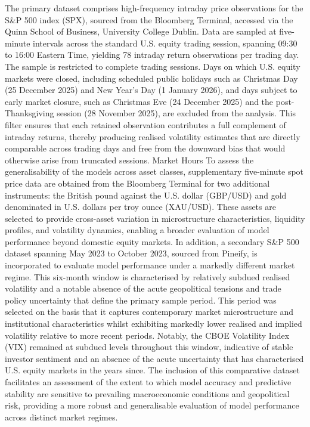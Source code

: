 \documentclass[12pt,a4paper]{report}
\begin{document}
The primary dataset comprises high-frequency intraday price observations for the S&P 500 index (SPX), sourced from the Bloomberg Terminal, accessed via the Quinn School of Business, University College Dublin. Data are sampled at five-minute intervals across the standard U.S. equity trading session, spanning 09:30 to 16:00 Eastern Time, yielding 78 intraday return observations per trading day.
The sample is restricted to complete trading sessions. Days on which U.S. equity markets were closed, including scheduled public holidays such as Christmas Day (25 December 2025) and New Year's Day (1 January 2026), and days subject to early market closure, such as Christmas Eve (24 December 2025) and the post-Thanksgiving session (28 November 2025), are excluded from the analysis. This filter ensures that each retained observation contributes a full complement of intraday returns, thereby producing realised volatility estimates that are directly comparable across trading days and free from the downward bias that would otherwise arise from truncated sessions.
Market Hours
To assess the generalisability of the models across asset classes, supplementary five-minute spot price data are obtained from the Bloomberg Terminal for two additional instruments: the British pound against the U.S. dollar (GBP/USD) and gold denominated in U.S. dollars per troy ounce (XAU/USD). These assets are selected to provide cross-asset variation in microstructure characteristics, liquidity profiles, and volatility dynamics, enabling a broader evaluation of model performance beyond domestic equity markets.
In addition, a secondary S&P 500 dataset spanning May 2023 to October 2023, sourced from Pineify, is incorporated to evaluate model performance under a markedly different market regime. This six-month window is characterised by relatively subdued realised volatility and a notable absence of the acute geopolitical tensions and trade policy uncertainty that define the primary sample period. 
This period was selected on the basis that it captures contemporary market microstructure and institutional characteristics whilst exhibiting markedly lower realised and implied volatility relative to more recent periods. Notably, the CBOE Volatility Index (VIX) remained at subdued levels throughout this window, indicative of stable investor sentiment and an absence of the acute uncertainty that has characterised U.S. equity markets in the years since. The inclusion of this comparative dataset facilitates an assessment of the extent to which model accuracy and predictive stability are sensitive to prevailing macroeconomic conditions and geopolitical risk, providing a more robust and generalisable evaluation of model performance across distinct market regimes.
\end{document}
